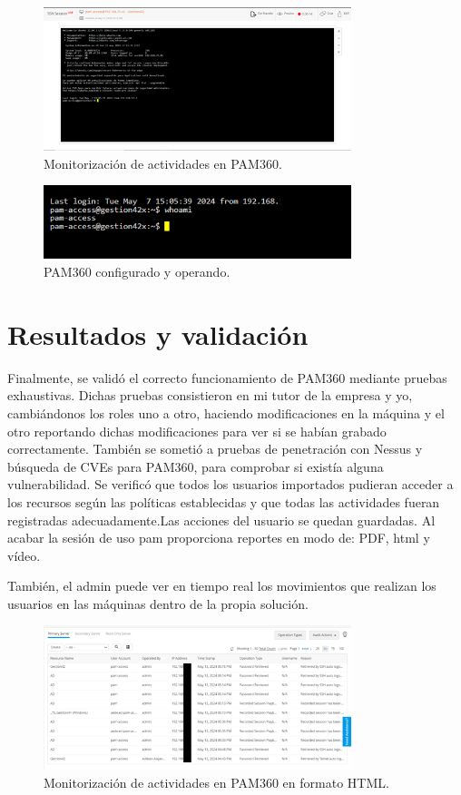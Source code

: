 \begin{figure}[H]
	\centering
	\includegraphics[width=0.8\textwidth]{./img/pam-ssh_live.png}
	\caption{Monitorización de actividades en PAM360.}
	\label{fig:pam_live}
\end{figure}

\begin{figure}[H]
	\centering
	\includegraphics[width=0.8\textwidth]{./img/pam_live.png}
	\caption{PAM360 configurado y operando.}
	\label{fig:pam_live2}
\end{figure}



\section{Resultados y validación}
Finalmente, se validó el correcto funcionamiento de PAM360 mediante pruebas exhaustivas. Dichas pruebas consistieron en mi tutor de la empresa y yo, cambiándonos los roles uno a otro, haciendo modificaciones en la máquina y el otro reportando dichas modificaciones para ver si se habían grabado correctamente. También se sometió a pruebas de penetración con Nessus y búsqueda de CVEs para PAM360, para comprobar si existía alguna vulnerabilidad. Se verificó que todos los usuarios importados pudieran acceder a los recursos según las políticas establecidas y que todas las actividades fueran registradas adecuadamente.Las acciones del usuario se quedan guardadas. Al acabar la sesión de uso pam proporciona reportes en modo de: PDF, html y vídeo.

También, el admin puede ver en tiempo real los movimientos que realizan los usuarios en las máquinas dentro de la propia solución.
\begin{figure}[H]
	\centering
	\includegraphics[width=0.8\textwidth]{./img/ad_movimientos.png}
	\caption{Monitorización de actividades en PAM360 en formato HTML.}
	\label{fig:ad_movimientos}
\end{figure}

